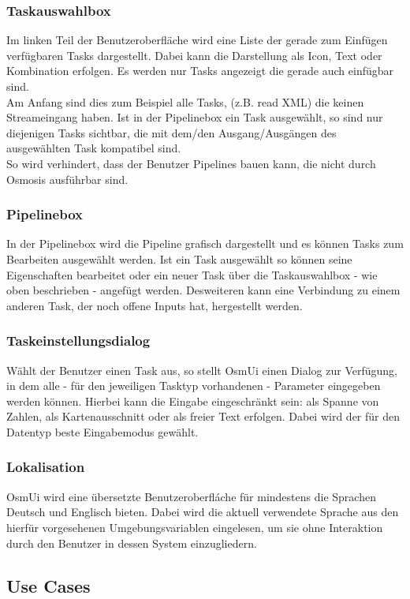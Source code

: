 \documentclass[a4paper,10pt]{scrartcl}
\begin{document}
\subsubsection{Taskauswahlbox}
Im linken Teil der Benutzeroberfläche wird eine Liste der gerade zum Einfügen verfügbaren Tasks dargestellt. Dabei kann die Darstellung als Icon,
Text oder Kombination erfolgen. Es werden nur Tasks angezeigt die gerade auch einfügbar sind. \\
Am Anfang sind dies zum Beispiel alle Tasks, (z.B. read XML) die keinen Streameingang haben. Ist in der Pipelinebox ein Task ausgewählt, so
sind nur diejenigen Tasks sichtbar, die mit dem/den Ausgang/Ausgängen des ausgewählten Task kompatibel sind.\\
So wird verhindert, dass der Benutzer Pipelines bauen kann, die nicht durch Osmosis ausführbar sind.
\subsubsection{Pipelinebox}
In der Pipelinebox wird die Pipeline grafisch dargestellt und es können Tasks zum Bearbeiten ausgewählt werden. Ist ein Task ausgewählt so können seine Eigenschaften
bearbeitet oder ein neuer Task über die Taskauswahlbox - wie oben beschrieben - angefügt werden. Desweiteren kann eine Verbindung zu einem anderen Task, der noch offene
Inputs hat, hergestellt werden.
\subsubsection{Taskeinstellungsdialog}
Wählt der Benutzer einen Task aus, so stellt OsmUi einen Dialog zur Verfügung, in dem alle - für den jeweiligen Tasktyp vorhandenen - Parameter eingegeben werden können.
Hierbei kann die Eingabe eingeschränkt sein: als Spanne von Zahlen, als Kartenausschnitt oder als freier Text erfolgen. Dabei wird der für
den Datentyp beste Eingabemodus gewählt.
\subsubsection{Lokalisation}
OsmUi wird eine übersetzte Benutzeroberfláche für mindestens die Sprachen Deutsch und Englisch bieten. Dabei wird die aktuell verwendete
Sprache aus den hierfür vorgesehenen Umgebungsvariablen eingelesen, um sie ohne Interaktion durch den Benutzer in dessen System einzugliedern.

\subsection{Use Cases}
\end{document}
